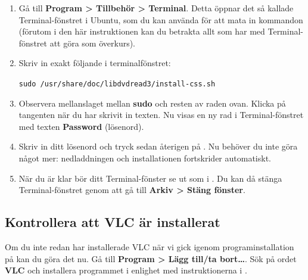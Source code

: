 \documentclass[a4paper,final]{memoir} %
\begin{document}
\begin{enumerate}

\item Gå till \textbf{Program \textgreater{} Tillbehör \textgreater{} Terminal}. Detta öppnar det så kallade Terminal-fönstret i Ubuntu, som du kan använda för att mata in kommandon (förutom i den här instruktionen kan du betrakta allt som har med Terminal-fönstret att göra som överkurs).

\item Skriv in exakt följande i terminalfönstret:

\texttt{sudo /usr/share/doc/libdvdread3/install-css.sh}

\item Observera mellanslaget mellan \textbf{sudo} och resten av raden ovan. Klicka på tangenten \xenter{} när du har skrivit in texten. Nu visas en ny rad i Terminal-fönstret med texten \textbf{Password} (lösenord).

\item Skriv in ditt lösenord och tryck sedan återigen på \xenter{}. Nu behöver du inte göra något mer: nedladdningen och installationen fortskrider automatiskt. 

\item När du är klar bör ditt Terminal-fönster se ut som i . Du kan då stänga Terminal-fönstret genom att gå till \textbf{Arkiv \textgreater{} Stäng fönster}.

\end{enumerate}



\subsection{Kontrollera att VLC är installerat}


Om du inte redan har installerade VLC när vi gick igenom programinstallation på  kan du göra det nu. Gå till \textbf{Program \textgreater{} Lägg till/ta bort\ldots{}}. Sök på ordet \textbf{VLC} och installera programmet i enlighet med instruktionerna i .

\end{document}
